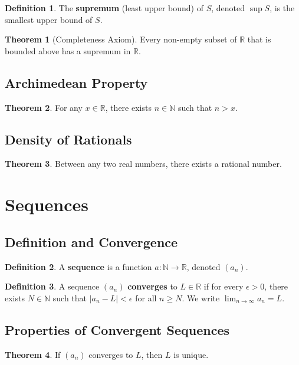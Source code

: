 \documentclass[11pt]{article}
\theoremstyle{definition}
\newtheorem{definition}{Definition}[section]
\newtheorem{theorem}{Theorem}[section]
\begin{document}
\begin{definition}
The \textbf{supremum} (least upper bound) of $S$, denoted $\sup S$, is the smallest upper bound of $S$.
\end{definition}

\begin{theorem}[Completeness Axiom]
Every non-empty subset of $\mathbb{R}$ that is bounded above has a supremum in $\mathbb{R}$.
\end{theorem}

\subsection{Archimedean Property}
\begin{theorem}
For any $x \in \mathbb{R}$, there exists $n \in \mathbb{N}$ such that $n > x$.
\end{theorem}

\subsection{Density of Rationals}
\begin{theorem}
Between any two real numbers, there exists a rational number.
\end{theorem}

\section{Sequences}

\subsection{Definition and Convergence}
\begin{definition}
A \textbf{sequence} is a function $a: \mathbb{N} \to \mathbb{R}$, denoted $(a_n)$.
\end{definition}

\begin{definition}
A sequence $(a_n)$ \textbf{converges} to $L \in \mathbb{R}$ if for every $\epsilon > 0$, there exists $N \in \mathbb{N}$ such that $|a_n - L| < \epsilon$ for all $n \geq N$. We write $\lim_{n \to \infty} a_n = L$.
\end{definition}

\subsection{Properties of Convergent Sequences}
\begin{theorem}
If $(a_n)$ converges to $L$, then $L$ is unique.
\end{theorem}
\end{document}
